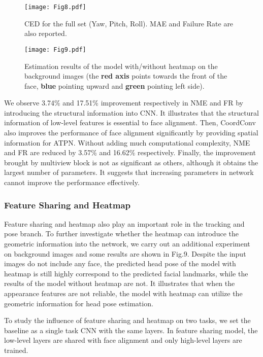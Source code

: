 \documentclass[3p,twocolumn, round, sort & compress]{elsarticle}
\begin{document}
\begin{figure}[t!]
	\centering
	\texttt{[image: Fig8.pdf]}
	\caption{CED for the full set (Yaw, Pitch, Roll). MAE and Failure Rate are also reported.}
	\label{fig8}
\end{figure}

\begin{figure}[t!]
	\centering
	\texttt{[image: Fig9.pdf]}
	\caption{Estimation results of the model with/without heatmap on the background images (the {\color{red} \textbf{red axis}} points towards the front of the face, {\color{blue} \textbf{blue}} pointing upward and {\color{green} \textbf{green}} pointing left side).}
	\label{fig9}
\end{figure}

We observe 3.74\% and 17.51\% improvement respectively in NME and FR by introducing the structural information into CNN. It illustrates that the structural information of low-level features is essential to face alignment. Then, CoordConv also improves the performance of face alignment significantly by providing spatial information for ATPN. Without adding much computational complexity, NME and FR are reduced by 3.57\% and 16.62\% respectively. Finally, the improvement brought by multiview block is not as significant as others, although it obtains the largest number of parameters. It suggests that increasing parameters in network cannot improve the performance effectively. 

\subsubsection{Feature Sharing and Heatmap}
Feature sharing and heatmap also play an important role in the tracking and pose branch. To further investigate whether the heatmap can introduce the geometric information into the network, we carry out an additional experiment on background images and some results are shown in Fig.9. Despite the input images do not include any face, the predicted head pose of the model with heatmap is still highly correspond to the predicted facial landmarks, while the results of the model without heatmap are not. It illustrates that when the appearance features are not reliable, the model with heatmap can utilize the geometric information for head pose estimation.

To study the influence of feature sharing and heatmap on two tasks, we set the baseline as a single task CNN with the same layers. In feature sharing model, the low-level layers are shared with face alignment and only high-level layers are trained.
\end{document}
